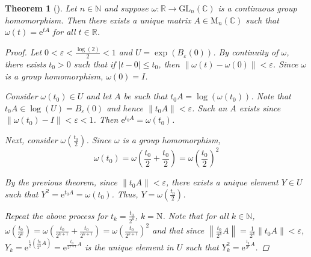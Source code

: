 \documentclass[letterpaper, 10pt]{article}
\theoremstyle{theostyle}
\newtheorem{theorem}{Theorem}[section]
\newenvironment{thmstyle}[1][]{%
    \begin{theorem}[#1]\leavevmode\vspace{-\baselineskip}\myquote%
    }{\endmyquote\end{theorem}}
\begin{document}
\begin{thmstyle}
    Let \(n \in \mathbb{N}\) and suppose \(\omega:\mathbb{R} \rightarrow \mathrm{GL}_n(\mathbb{C})\) is a continuous group homomorphism.
    Then there exists a unique matrix \(A \in \mathrm{M}_n(\mathbb{C})\) such that \(\omega(t) = \mathrm{e}^{tA}\) for all \(t \in \mathbb{R}\).
    \begin{proof}
        Let \(0 < \varepsilon < \frac{\log{(2)}}{2} < 1\) and \(U = \exp{\left(B_\varepsilon (0)\right)}\).
        By continuity of \(\omega\), there exists \(t_0 > 0\) such that if \(\lvert t - 0 \rvert \leq t_0\), then \(\lVert \omega (t) - \omega (0) \rVert < \varepsilon\).
        Since \(\omega\) is a group homomorphism, \(\omega(0) = I\).


        Consider \(\omega (t_0) \in U\) and let \(A\) be such that \(t_0 A = \log{(\omega (t_0))}\).
        Note that \(t_0A \in \log{(U)} = B_\varepsilon (0)\) and hence \(\lVert t_0 A \rVert < \varepsilon\).
        Such an \(A\) exists since \(\lVert \omega (t_0) - I\rVert < \varepsilon < 1\).
        Then \(\mathrm{e}^{t_0 A} = \omega (t_0)\).


        Next, consider \(\omega\left(\frac{t_0}{2}\right)\).
        Since \(\omega\) is a group homomorphism,
        \[\omega (t_0) = \omega \left(\frac{t_0}{2} + \frac{t_0}{2}\right) = \omega \left(\frac{t_0}{2}\right)^2\]
        
        
        By the previous theorem, since \(\lVert t_0 A \rVert < \varepsilon\), there exists a unique element \(Y \in U\) such that \(Y^2 = \mathrm{e}^{t_0A} = \omega (t_0)\).
        Thus, \(Y = \omega \left(\frac{t_0}{2}\right)\).


        Repeat the above process for \(t_k = \frac{t_0}{2^k}\), \(k = \mathrm{N}\).
        Note that for all \(k \in \mathbb{N}\), \(\omega \left(\frac{t_0}{2^k}\right) = \omega \left(\frac{t_0}{2^{k+1}} + \frac{t_0}{2^{k+1}}\right) = \omega \left(\frac{t_0}{2^{k+1}}\right)^2\)
        and that since \(\left\lVert \frac{t_0}{2^k} A \right\rVert = \frac{1}{2^k} \lVert t_0A \rVert < \varepsilon \), \(Y_k = \mathrm{e}^{\frac{1}{2} \left(\frac{t_0}{2^k} A \right)} = \mathrm{e}^{\frac{t_0}{2^{k+1}} A }\)
        is the unique element in \(U\) such that \(Y_k^2 = \mathrm{e}^{\frac{t_0}{2^k}A}\).


\end{proof}
\end{thmstyle}
\end{document}
